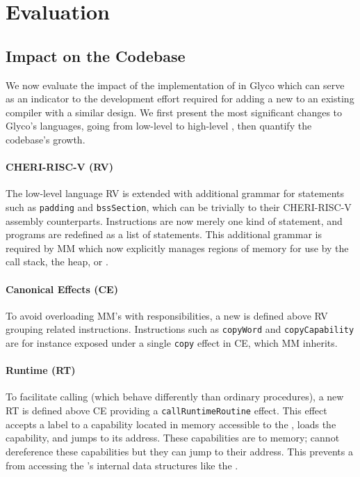 \documentclass[main.tex]{subfiles}
\begin{document}
\section{Evaluation} \label{sct:ghscc-eval}
\subsection{Impact on the Codebase}
We now evaluate the impact of the implementation of  in Glyco which can serve as an indicator to the development effort required for adding a new  to an existing  compiler with a similar design. We first present the most significant changes to Glyco's languages, going from low-level to high-level , then quantify the codebase's growth.

\paragraph{CHERI-RISC-V (RV)} The low-level language RV is extended with additional grammar for statements such as \texttt{padding} and \texttt{bssSection}, which can be  trivially to their CHERI-RISC-V assembly counterparts. Instructions are now merely one kind of statement, and programs are redefined as a list of statements. This additional grammar is required by MM which now explicitly manages regions of memory for use by the call stack, the heap, or .

\paragraph{Canonical Effects (CE)} To avoid overloading MM's  with responsibilities, a new  is defined above RV grouping related instructions. Instructions such as \texttt{copyWord} and \texttt{copyCapability} are for instance exposed under a single \texttt{copy} effect in CE, which MM inherits.

\paragraph{Runtime (RT)} To facilitate calling  (which behave differently than ordinary procedures), a new  RT is defined above CE providing a \texttt{callRuntimeRoutine} effect. This effect accepts a label to a capability located in memory accessible to the , loads the capability, and jumps to its address. These capabilities are  to  memory;  cannot dereference these capabilities but they can jump to their address. This prevents a  from accessing the 's internal data structures like the .
\end{document}

